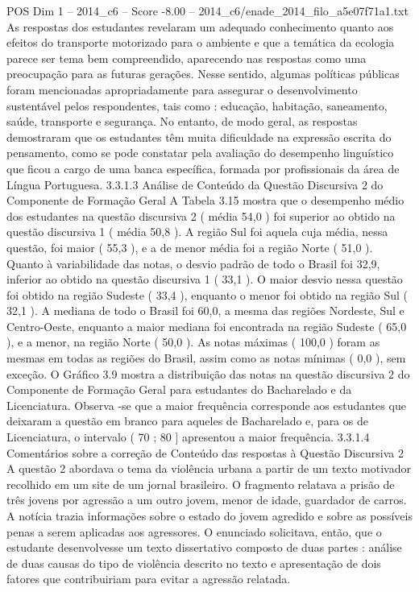 \begin{textsample}{POS Dim 1 – 2014\_c6 – Score -8.00 – 2014\_c6/enade\_2014\_filo\_a5e07f71a1.txt}
As respostas dos estudantes revelaram um adequado conhecimento quanto aos efeitos do transporte motorizado para o ambiente e que a temática da ecologia parece ser tema bem compreendido, aparecendo nas respostas como uma preocupação para as futuras gerações.
Nesse sentido, algumas políticas públicas foram mencionadas apropriadamente para assegurar o desenvolvimento sustentável pelos respondentes, tais como : educação, habitação, saneamento, saúde, transporte e segurança.
No entanto, de modo geral, as respostas demostraram que os estudantes têm muita dificuldade na expressão escrita do pensamento, como se pode constatar pela avaliação do desempenho linguístico que ficou a cargo de uma banca específica, formada por profissionais da área de Língua Portuguesa. 3.3.1.3 Análise de Conteúdo da Questão Discursiva 2 do Componente de Formação Geral A Tabela 3.15 mostra que o desempenho médio dos estudantes na questão discursiva 2 ( média 54,0 ) foi superior ao obtido na questão discursiva 1 ( média 50,8 ).
A região Sul foi aquela cuja média, nessa questão, foi maior ( 55,3 ), e a de menor média foi a região Norte ( 51,0 ).
Quanto à variabilidade das notas, o desvio padrão de todo o Brasil foi 32,9, inferior ao obtido na questão discursiva 1 ( 33,1 ).
O maior desvio nessa questão foi obtido na região Sudeste ( 33,4 ), enquanto o menor foi obtido na região Sul ( 32,1 ).
A mediana de todo o Brasil foi 60,0, a mesma das regiões Nordeste, Sul e Centro-Oeste, enquanto a maior mediana foi encontrada na região Sudeste ( 65,0 ), e a menor, na região Norte ( 50,0 ).
As notas máximas ( 100,0 ) foram as mesmas em todas as regiões do Brasil, assim como as notas mínimas ( 0,0 ), sem exceção.
O Gráfico 3.9 mostra a distribuição das notas na questão discursiva 2 do Componente de Formação Geral para estudantes do Bacharelado e da Licenciatura.
Observa -se que a maior frequência corresponde aos estudantes que deixaram a questão em branco para aqueles de Bacharelado e, para os de Licenciatura, o intervalo ( 70 ; 80 ] apresentou a maior frequência. 3.3.1.4 Comentários sobre a correção de Conteúdo das respostas à Questão Discursiva 2 A questão 2 abordava o tema da violência urbana a partir de um texto motivador recolhido em um site de um jornal brasileiro.
O fragmento relatava a prisão de três jovens por agressão a um outro jovem, menor de idade, guardador de carros.
A notícia trazia informações sobre o estado do jovem agredido e sobre as possíveis penas a serem aplicadas aos agressores.
O enunciado solicitava, então, que o estudante desenvolvesse um texto dissertativo composto de duas partes : análise de duas causas do tipo de violência descrito no texto e apresentação de dois fatores que contribuiriam para evitar a agressão relatada.

\end{textsample}
